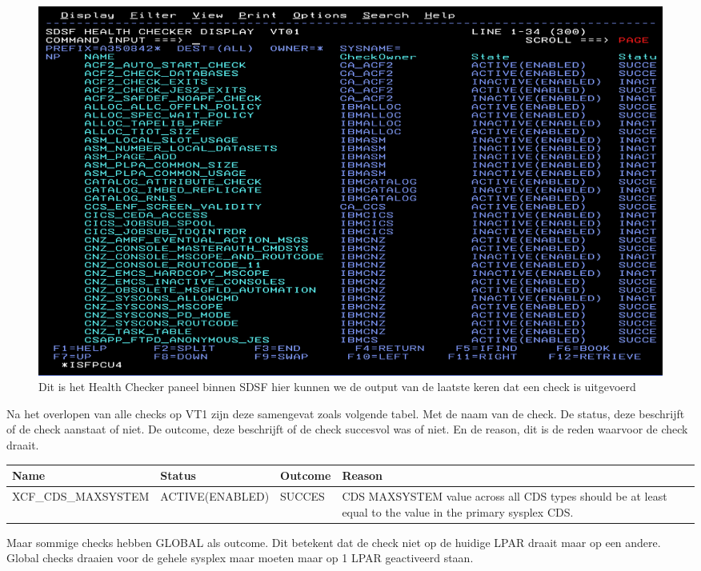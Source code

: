 \begin{figure}[h]
	\centering
	\includegraphics[width=0.7\linewidth]{img/SDSFCK}
	\caption[Health Checker Scherm binnen SDSF]{Dit is het Health Checker paneel binnen SDSF hier kunnen we de output van de laatste keren dat een check is uitgevoerd}
	\label{fig:sdsfck}
\end{figure}


Na het overlopen van alle checks op VT1 zijn deze samengevat zoals volgende tabel. Met de naam van de check. De status, deze beschrijft of de check aanstaat of niet. De outcome, deze beschrijft of de check succesvol was of niet. En de reason, dit is de reden waarvoor de check draait.

\begin{tabular}{|p{5cm}|p{3.5cm}|p{1.5cm}|p{5cm}|}
	\hline
	\textbf{Name} & \textbf{Status} & \textbf{Outcome} & \textbf{Reason} \\
	\hline
	XCF\_CDS\_MAXSYSTEM & ACTIVE(ENABLED) & SUCCES & CDS MAXSYSTEM value across all CDS types should be at least equal to the value 
	in the primary sysplex CDS.  \\
	\hline
\end{tabular}

Maar sommige checks hebben GLOBAL als outcome. Dit betekent dat de check niet op de huidige LPAR draait maar op een andere. Global checks draaien voor de gehele sysplex maar moeten maar op 1 LPAR geactiveerd staan.
